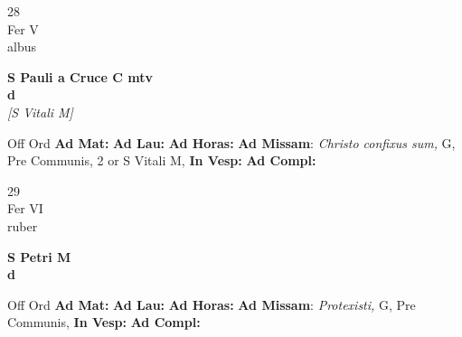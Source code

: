 \documentclass[10pt, openany]{book}
\begin{document}
        \begin{center}
            \begin{minipage}{3.5in}
                \vspace{2em}
                \begin{minipage}{0.5in}
                    {\Huge 28} \\
                    {\normalsize Fer V} \\
                    {\normalsize albus}
                \end{minipage}
                \begin{minipage}{3.0in}
                    \textbf{ \large S Pauli a Cruce C mtv \\
                    \textnormal{\normalsize d}} \\ \textit{[S Vitali M]} \\ 
                \end{minipage}
                \begin{justify}Off Ord
                    \textbf{Ad Mat: }
                    \textbf{Ad Lau: }
                    \textbf{Ad Horas: }\textbf{Ad Missam}: \textit{Christo confixus sum,} G, Pre Communis, 2 or S Vitali M,  
                    \textbf{In Vesp: }
                    \textbf{Ad Compl: }
                \end{justify}
            \end{minipage}
        \end{center}
    
        \begin{center}
            \begin{minipage}{3.5in}
                \vspace{2em}
                \begin{minipage}{0.5in}
                    {\Huge 29} \\
                    {\normalsize Fer VI} \\
                    {\normalsize ruber}
                \end{minipage}
                \begin{minipage}{3.0in}
                    \textbf{ \large S Petri M \\
                    \textnormal{\normalsize d}} \\ 
                \end{minipage}
                \begin{justify}Off Ord
                    \textbf{Ad Mat: }
                    \textbf{Ad Lau: }
                    \textbf{Ad Horas: }\textbf{Ad Missam}: \textit{Protexisti,} G, Pre Communis,  
                    \textbf{In Vesp: }
                    \textbf{Ad Compl: }
                \end{justify}
            \end{minipage}
        \end{center}
    
\end{document}
